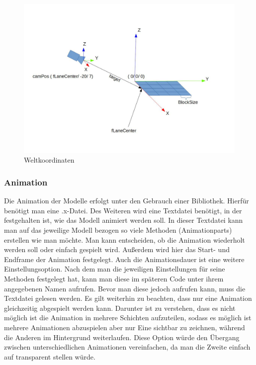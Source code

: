\documentclass[10pt]{article}
\begin{document}
\begin{figure}[H]
	\centering
	\includegraphics[width=1\textwidth]{Weltkoordinaten}
	\caption{Weltkoordinaten
		\label{fig:coordinates}}
\end{figure}

\vspace{0.5cm}
\subsubsection{Animation}
Die Animation der Modelle erfolgt unter den Gebrauch einer Bibliothek. Hierfür benötigt man eine .x-Datei.
Des Weiteren wird eine Textdatei benötigt, in der festgehalten ist, wie das Modell animiert werden soll.
In dieser Textdatei kann man auf das jeweilige Modell bezogen so viele Methoden (Animationparts) erstellen
wie man möchte. Man kann entscheiden, ob die Animation wiederholt werden soll oder einfach gespielt wird.
Außerdem wird hier das Start- und Endframe der Animation festgelegt. Auch die Animationsdauer ist eine weitere
Einstellungsoption. Nach dem man die jeweiligen Einstellungen für seine Methoden festgelegt hat, kann man diese
im späteren Code unter ihrem angegebenen Namen aufrufen. Bevor man diese jedoch aufrufen kann, muss die
Textdatei gelesen werden. Es gilt weiterhin zu beachten, dass nur eine Animation gleichzeitig abgespielt werden kann.
Darunter ist zu verstehen, dass es nicht möglich ist die Animation in mehrere Schichten aufzuteilen, sodass es möglich ist
mehrere Animationen abzuspielen aber nur Eine sichtbar zu zeichnen, während die Anderen im Hintergrund weiterlaufen.
Diese Option würde den Übergang zwischen unterschiedlichen Animationen vereinfachen, da man die Zweite einfach auf
transparent stellen würde.
\end{document}
